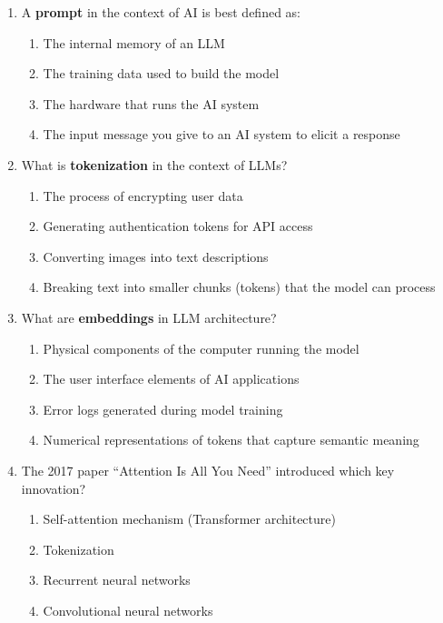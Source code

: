 \documentclass[11pt]{article}
\begin{document}
\begin{enumerate}

\item A \textbf{prompt} in the context of AI is best defined as:
\begin{enumerate}[label=\Alph*)]
    \item The internal memory of an LLM
    \item The training data used to build the model
    \item The hardware that runs the AI system
    \item The input message you give to an AI system to elicit a response
\end{enumerate}

\item What is \textbf{tokenization} in the context of LLMs?
\begin{enumerate}[label=\Alph*)]
    \item The process of encrypting user data
    \item Generating authentication tokens for API access
    \item Converting images into text descriptions
    \item Breaking text into smaller chunks (tokens) that the model can process
\end{enumerate}

\item What are \textbf{embeddings} in LLM architecture?
\begin{enumerate}[label=\Alph*)]
    \item Physical components of the computer running the model
    \item The user interface elements of AI applications
    \item Error logs generated during model training
    \item Numerical representations of tokens that capture semantic meaning
\end{enumerate}

\item The 2017 paper ``Attention Is All You Need'' introduced which key innovation?
\begin{enumerate}[label=\Alph*)]
    \item Self-attention mechanism (Transformer architecture)
    \item Tokenization
    \item Recurrent neural networks
    \item Convolutional neural networks
\end{enumerate}


\end{enumerate}
\end{document}
